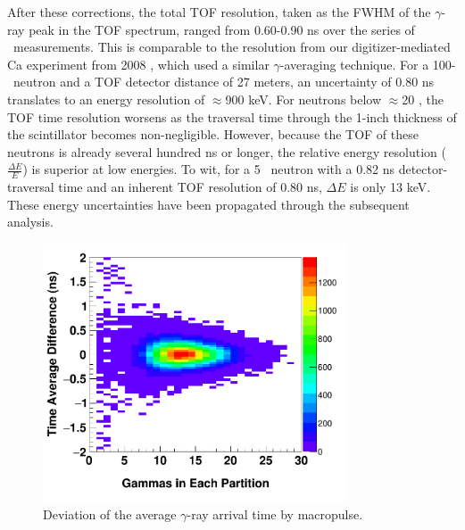 After these corrections, the total TOF
resolution, taken as the FWHM of the $\gamma$-ray peak in the TOF
spectrum, ranged from 0.60-0.90 ns over the series of \tot\ measurements. This is comparable 
to the resolution from our digitizer-mediated Ca experiment from 2008 \cite{Shane2010},
which used a similar $\gamma$-averaging technique. For a 100-\mega\electronvolt\
neutron and a TOF detector distance of 27 meters, an
uncertainty of 0.80 ns translates to an energy resolution of $\approx$900 keV.
For neutrons below $\approx$20 \mega\electronvolt, the TOF time resolution worsens as the 
traversal time through the 1-inch thickness of the scintillator becomes non-negligible.
However, because the TOF of these neutrons is already several hundred ns or
longer, the relative energy resolution ($\frac{\Delta E}{E}$) is
superior at low energies. To wit, for a 5 \mega\electronvolt\ neutron with a 0.82 ns detector-traversal time and
an inherent TOF resolution of 0.80 ns, $\Delta E$ is only 13 keV. These energy uncertainties
have been propagated through the subsequent analysis.

\begin{figure}[tb]
    \centering
    \includegraphics[width=0.8\textwidth]{figures/gammaCorrection2D.png}
    \caption[Deviation of the average $\gamma$-ray arrival time by macropulse]
    {Deviation of the average $\gamma$-ray arrival time by macropulse. }
    \label{GammaCorrection}
\end{figure}

